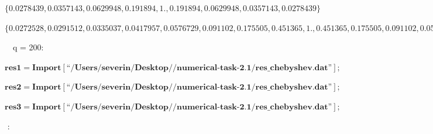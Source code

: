 \documentclass{article}
\newcommand{\unicode}[1]{{}}
\begin{document}
\begin{doublespace}
\noindent\(\{0.0278439,0.0357143,0.0629948,0.191894,1.,0.191894,0.0629948,0.0357143,0.0278439\}\)
\end{doublespace}

\begin{doublespace}
\noindent\(\{0.0272528,0.0291512,0.0335037,0.0417957,0.0576729,0.091102,0.175505,0.451365,1.,0.451365,0.175505,0.091102,0.0576729,0.0417957,0.0335037,0.0291512,0.0272528\}\)
\end{doublespace}

$\unicode{0417}\unicode{0430}\unicode{043f}\unicode{0443}\unicode{0441}\unicode{0442}\unicode{0438}\unicode{043c}$ $\unicode{043f}\unicode{0440}\unicode{043e}\unicode{0433}\unicode{0440}\unicode{0430}\unicode{043c}\unicode{043c}\unicode{0443}$
$\unicode{0434}\unicode{043b}\unicode{044f}$ q = 200:

\begin{doublespace}
\noindent\(\pmb{\text{res1} = \text{Import}[\text{{``}/Users/severin/Desktop/$\unicode{041f}\unicode{0440}\unicode{0430}\unicode{043a}\unicode{0442}\unicode{0438}\unicode{043a}\unicode{0443}\unicode{043c}$/numerical-task-2.1/res$\_$chebyshev.dat{''}}];}\)
\end{doublespace}

\begin{doublespace}
\noindent\(\pmb{\text{res2} = \text{Import}[\text{{``}/Users/severin/Desktop/$\unicode{041f}\unicode{0440}\unicode{0430}\unicode{043a}\unicode{0442}\unicode{0438}\unicode{043a}\unicode{0443}\unicode{043c}$/numerical-task-2.1/res$\_$chebyshev.dat{''}}];}\)
\end{doublespace}

\begin{doublespace}
\noindent\(\pmb{\text{res3} = \text{Import}[\text{{``}/Users/severin/Desktop/$\unicode{041f}\unicode{0440}\unicode{0430}\unicode{043a}\unicode{0442}\unicode{0438}\unicode{043a}\unicode{0443}\unicode{043c}$/numerical-task-2.1/res$\_$chebyshev.dat{''}}];}\)
\end{doublespace}

$\unicode{041f}\unicode{043e}\unicode{0441}\unicode{0442}\unicode{0440}\unicode{043e}\unicode{0438}\unicode{043c}$ $\unicode{0433}\unicode{0440}\unicode{0430}\unicode{0444}\unicode{0438}\unicode{043a}\unicode{0438}$:
\end{document}
